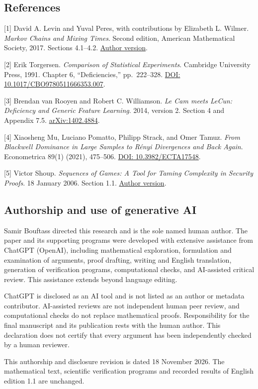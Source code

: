 \documentclass[
]{article}
\begin{document}
\subsection{References}\label{references}

{[}1{]} David A. Levin and Yuval Peres, with contributions by Elizabeth
L. Wilmer. \emph{Markov Chains and Mixing Times}. Second edition,
American Mathematical Society, 2017. Sections 4.1--4.2.
\href{https://pages.uoregon.edu/dlevin/MARKOV/markovmixing.pdf}{Author
version}.

{[}2{]} Erik Torgersen. \emph{Comparison of Statistical Experiments}.
Cambridge University Press, 1991. Chapter 6, ``Deficiencies,''
pp.~222--328. \href{https://doi.org/10.1017/CBO9780511666353.007}{DOI:
10.1017/CBO9780511666353.007}.

{[}3{]} Brendan van Rooyen and Robert C. Williamson. \emph{Le Cam meets
LeCun: Deficiency and Generic Feature Learning}. 2014, version 2.
Section 4 and Appendix 7.5.
\href{https://arxiv.org/abs/1402.4884}{arXiv:1402.4884}.

{[}4{]} Xiaosheng Mu, Luciano Pomatto, Philipp Strack, and Omer Tamuz.
\emph{From Blackwell Dominance in Large Samples to Rényi Divergences and
Back Again}. Econometrica 89(1) (2021), 475--506.
\href{https://doi.org/10.3982/ECTA17548}{DOI: 10.3982/ECTA17548}.

{[}5{]} Victor Shoup. \emph{Sequences of Games: A Tool for Taming
Complexity in Security Proofs}. 18 January 2006. Section 1.1.
\href{https://www.shoup.net/papers/games.pdf}{Author version}.

\subsection{Authorship and use of generative
AI}\label{authorship-and-use-of-generative-ai}

Samir Bouftass directed this research and is the sole named human
author. The paper and its supporting programs were developed with
extensive assistance from ChatGPT (OpenAI), including mathematical
exploration, formulation and examination of arguments, proof drafting,
writing and English translation, generation of verification programs,
computational checks, and AI-assisted critical review. This assistance
extends beyond language editing.

ChatGPT is disclosed as an AI tool and is not listed as an author or
metadata contributor. AI-assisted reviews are not independent human peer
review, and computational checks do not replace mathematical proofs.
Responsibility for the final manuscript and its publication rests with
the human author. This declaration does not certify that every argument
has been independently checked by a human reviewer.

This authorship and disclosure revision is dated 18 November 2026. The
mathematical text, scientific verification programs and recorded results
of English edition 1.1 are unchanged.
\end{document}
